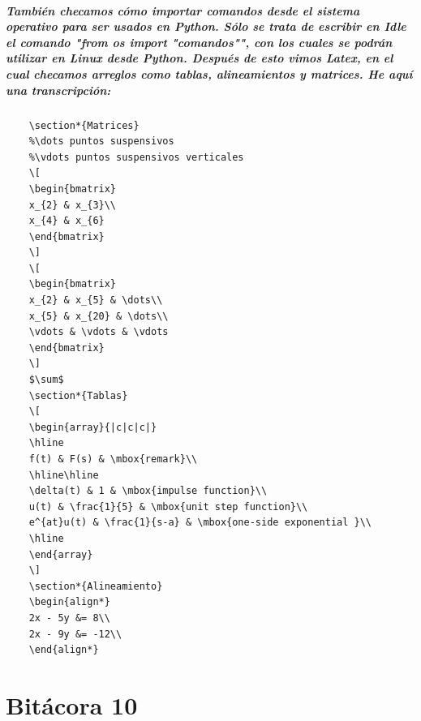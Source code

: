 \documentclass{book}
\begin{document}
	\paragraph{También checamos cómo importar comandos desde el sistema operativo para ser usados en Python. Sólo se trata de escribir en Idle el comando "from os import "comandos"", con los cuales se podrán utilizar en Linux desde Python. Después de esto vimos Latex, en el cual checamos arreglos como tablas, alineamientos y matrices. He aquí una transcripción:}
	\begin{verbatim}
	\section*{Matrices}
	%\dots puntos suspensivos
	%\vdots puntos suspensivos verticales
	\[
	\begin{bmatrix}
	x_{2} & x_{3}\\
	x_{4} & x_{6}
	\end{bmatrix}
	\]
	\[
	\begin{bmatrix}
	x_{2} & x_{5} & \dots\\
	x_{5} & x_{20} & \dots\\
	\vdots & \vdots & \vdots
	\end{bmatrix}
	\]
	$\sum$
	\section*{Tablas}
	\[
	\begin{array}{|c|c|c|}
	\hline
	f(t) & F(s) & \mbox{remark}\\
	\hline\hline
	\delta(t) & 1 & \mbox{impulse function}\\
	u(t) & \frac{1}{5} & \mbox{unit step function}\\
	e^{at}u(t) & \frac{1}{s-a} & \mbox{one-side exponential }\\
	\hline
	\end{array}
	\]
	\section*{Alineamiento}
	\begin{align*}
	2x - 5y &= 8\\
	2x - 9y &= -12\\
	\end{align*}
	\end{verbatim}
	\chapter{Bitácora 10}
\end{document}
